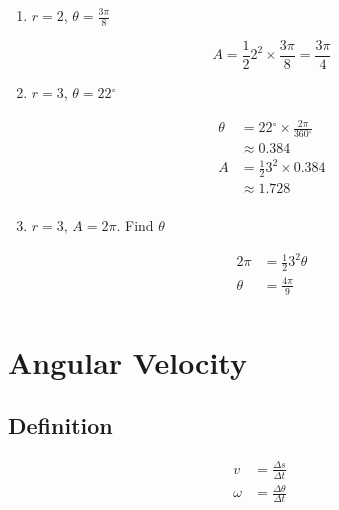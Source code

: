 \documentclass{exam}
\newcommand{\dg}{\ensuremath{^\circ}}
\begin{document}
  \begin{enumerate}
    \item $r = 2$, $\theta = \frac{3 \pi}{8}$
      \begin{solution}
        \[
          A = \frac{1}{2} 2^2 \times \frac{3 \pi}{8} = \boxed{ \frac{3 \pi}{4} } 
        \]
      \end{solution}

    \item $r = 3$, $\theta = 22 \dg$
      \begin{solution}
        \begin{align*}
          \theta & = 22 \dg \times \frac{2 \pi}{360 \dg} \\
                 & \approx 0.384 \\
          A      & = \frac{1}{2} 3^2 \times 0.384 \\
                 & \approx \boxed{ 1.728 } \\
        \end{align*}
      \end{solution}

    \item $r = 3$, $A = 2 \pi$.  Find $\theta$
      \begin{solution}
        \begin{align*}
          2 \pi  & = \frac{1}{2} 3^2 \theta \\
          \theta & = \boxed{ \frac{4 \pi}{9} } \\
        \end{align*}
      \end{solution}
  \end{enumerate}

  \section{Angular Velocity}

  \subsection{Definition}

  \begin{align*}
    v      & = \frac{\Delta s}{\Delta t} \\
    \omega & = \frac{\Delta \theta}{\Delta t} \\
  \end{align*}
\end{document}
